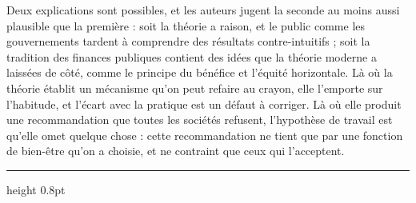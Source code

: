 \documentclass[11pt,a4paper]{article}
\begin{document}
Deux explications sont possibles, et les auteurs jugent la seconde au moins aussi plausible que la
première : soit la théorie a raison, et le public comme les gouvernements tardent à comprendre des
résultats contre-intuitifs ; soit la tradition des finances publiques contient des idées que la
théorie moderne a laissées de côté, comme le principe du bénéfice et l'équité horizontale. Là où la
théorie établit un mécanisme qu'on peut refaire au crayon, elle l'emporte sur l'habitude, et l'écart
avec la pratique est un défaut à corriger. Là où elle produit une recommandation que toutes les
sociétés refusent, l'hypothèse de travail est qu'elle omet quelque chose : cette recommandation ne
tient que par une fonction de bien-être qu'on a choisie, et ne contraint que ceux qui l'acceptent.

\vspace{1.4em}
{\color{bleu}\hrule height 0.8pt}
\vspace{0.8em}
\end{document}
